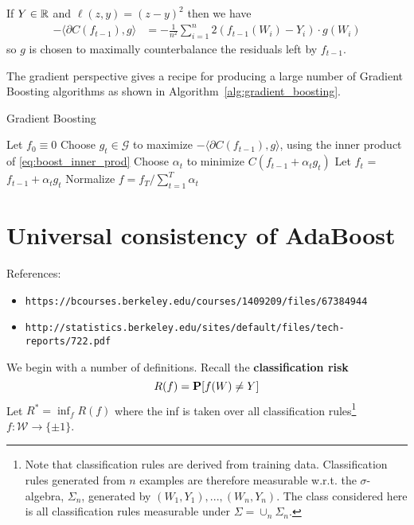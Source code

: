 If $Y \in \mathbb{R}$ and $\ell(z, y) = (z - y)^2$ then we have
\begin{align*}
	-\langle \partial C(f_{t-1}), g \rangle &= -\frac{1}{n^2}\sum_{i=1}^n 2(f_{t-1}(W_i) - Y_i) \cdot g(W_i)
\end{align*}
so $g$ is chosen to maximally counterbalance the residuals left by $f_{t-1}$.

The gradient perspective gives a recipe for producing a large number of Gradient Boosting algorithms as shown in Algorithm~\ref{alg:gradient_boosting}.

\begin{algorithm}
\caption{Gradient Boosting}
   \begin{algorithmic}[1] \label{alg:gradient_boosting}
   \STATE Let $f_0 \equiv 0$
   	\STATE Choose $g_t \in \mathcal{G}$ to maximize $-\langle \partial C(f_{t-1}), g \rangle$, using the inner product of \eqref{eq:boost_inner_prod}
   	\STATE Choose $\alpha_t$ to minimize $C(f_{t-1} + \alpha_t g_t)$
    \STATE Let $f_t$ = $f_{t-1} + \alpha_t g_t$
   \ENDFOR  
   \STATE Normalize $f = f_T/\sum_{t=1}^T \alpha_t$
\end{algorithmic}
\end{algorithm}





\section{Universal consistency of AdaBoost}

References: 
\begin{itemize}
\item \verb|https://bcourses.berkeley.edu/courses/1409209/files/67384944|
\item \verb|http://statistics.berkeley.edu/sites/default/files/tech-reports/722.pdf|
\end{itemize}

We begin with a number of definitions. Recall the \textbf{classification risk}
\begin{equation*}
	R(f) = \mathbf{P} [f(W) \ne Y]
\end{equation*}
Let $R^* = \inf_f R(f)$ where the inf is taken over all classification rules\footnote{Note that classification rules are derived from training data. Classification rules generated from $n$ examples are therefore measurable w.r.t. the $\sigma$-algebra, $\Sigma_n$, generated by $(W_1, Y_1), ..., (W_n, Y_n)$. The class considered here is all classification rules measurable under $\Sigma = \cup_n \Sigma_n$.} $f:\mathcal{W} \to \{\pm 1\}$.


